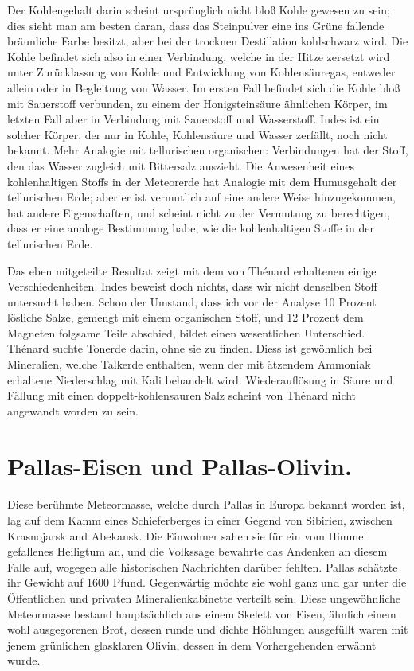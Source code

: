 \documentclass[a4paper, 11pt, oneside]{article}
\begin{document}
Der Kohlengehalt darin scheint ursprünglich nicht bloß Kohle gewesen zu sein; dies sieht man am besten daran, dass das Steinpulver eine ins Grüne fallende bräunliche Farbe besitzt, aber bei der trocknen Destillation kohlschwarz wird. Die Kohle befindet sich also in einer Verbindung, welche in der Hitze zersetzt wird unter Zurücklassung von Kohle und Entwicklung von Kohlensäuregas, entweder allein oder in Begleitung von Wasser. Im ersten Fall befindet sich die Kohle bloß mit Sauerstoff verbunden, zu einem der Honigsteinsäure ähnlichen Körper, im letzten Fall aber in Verbindung mit Sauerstoff und Wasserstoff. Indes ist ein solcher Körper, der nur in Kohle, Kohlensäure und Wasser zerfällt, noch nicht bekannt. Mehr Analogie mit tellurischen organischen: Verbindungen hat der Stoff, den das Wasser zugleich mit Bittersalz auszieht. Die Anwesenheit eines kohlenhaltigen Stoffs in der Meteorerde hat Analogie mit dem Humusgehalt der tellurischen Erde; aber er ist vermutlich auf eine andere Weise hinzugekommen, hat andere Eigenschaften, und scheint nicht zu der Vermutung zu berechtigen, dass er eine analoge Bestimmung habe, wie die kohlenhaltigen Stoffe in der tellurischen Erde.

Das eben mitgeteilte Resultat zeigt mit dem von Thénard erhaltenen einige Verschiedenheiten. Indes beweist doch nichts, dass wir nicht denselben Stoff untersucht haben. Schon der Umstand, dass ich vor der Analyse 10 Prozent lösliche Salze, gemengt mit einem organischen Stoff, und 12 Prozent dem Magneten folgsame Teile abschied, bildet einen wesentlichen Unterschied. Thénard suchte Tonerde darin, ohne sie zu finden. Diess ist gewöhnlich bei Mineralien, welche Talkerde enthalten, wenn der mit ätzendem Ammoniak erhaltene Niederschlag mit Kali behandelt wird. Wiederauflösung in Säure und Fällung mit einen doppelt-kohlensauren Salz scheint von Thénard nicht angewandt worden zu sein.

\section{Pallas-Eisen und Pallas-Olivin.}
\paragraph{}
Diese berühmte Meteormasse, welche durch Pallas in Europa bekannt worden ist, lag auf dem Kamm eines Schieferberges in einer Gegend von Sibirien, zwischen Krasnojarsk and Abekansk. Die Einwohner sahen sie für ein vom Himmel gefallenes Heiligtum an, und die Volkssage bewahrte das Andenken an diesem Falle auf, wogegen alle historischen Nachrichten darüber fehlten. Pallas schätzte ihr Gewicht auf 1600 Pfund. Gegenwärtig möchte sie wohl ganz und gar unter die Öffentlichen und privaten Mineralienkabinette verteilt sein. Diese ungewöhnliche Meteormasse bestand hauptsächlich aus einem Skelett von Eisen, ähnlich einem wohl ausgegorenen Brot, dessen runde und dichte Höhlungen ausgefüllt waren mit jenem grünlichen glasklaren Olivin, dessen in dem Vorhergehenden erwähnt wurde.
\end{document}
